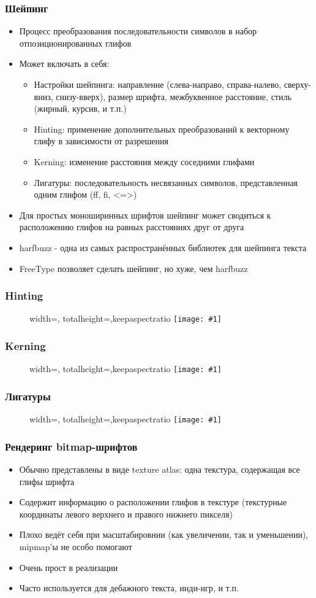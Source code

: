 \documentclass{beamer}
\newcommand{\slideimage}[1]{
  \begin{figure}
    \begin{adjustbox}{width=\textwidth, totalheight=\textheight-2\baselineskip-2\baselineskip,keepaspectratio}
      \texttt{[image: \#1]}
    \end{adjustbox}
  \end{figure}
}
\begin{document}
\begin{frame}[fragile]
\frametitle{Шейпинг}
\begin{itemize}
\item Процесс преобразования последовательности символов в набор отпозиционированных глифов
\pause
\item Может включать в себя:
\pause
\begin{itemize}
\item Настройки шейпинга: направление (слева-направо, справа-налево, сверху-вниз, снизу-вверх), размер шрифта, межбуквенное расстояние, стиль (жирный, курсив, и т.п.)
\pause
\item Hinting: применение дополнительных преобразований к векторному глифу в зависимости от разрешения
\pause
\item Kerning: изменение расстояния между соседними глифами
\pause
\item Лигатуры: последовательность несвязанных символов, представленная одним глифом (ff, fi, <=>)
\end{itemize}
\pause
\item Для простых моноширинных шрифтов шейпинг может сводиться к расположению глифов на равных расстояниях друг от друга
\pause
\item harfbuzz - одна из самых распространённых библиотек для шейпинга текста
\item FreeType позволяет сделать шейпинг, но хуже, чем harfbuzz
\end{itemize}
\end{frame}

\begin{frame}[fragile]
\frametitle{Hinting}
\slideimage{hinting.png}
\end{frame}

\begin{frame}[fragile]
\frametitle{Kerning}
\slideimage{kerning.png}
\end{frame}

\begin{frame}[fragile]
\frametitle{Лигатуры}
\slideimage{ligatures.png}
\end{frame}

\begin{frame}[fragile]
\frametitle{Рендеринг bitmap-шрифтов}
\begin{itemize}
\item Обычно представлены в виде texture atlas: одна текстура, содержащая все глифы шрифта
\pause
\item Содержит информацию о расположении глифов в текстуре (текстурные координаты левого верхнего и правого нижнего пикселя)
\pause
\item Плохо ведёт себя при масштабировнии (как увеличении, так и уменьшении), mipmap'ы не особо помогают
\pause
\item Очень прост в реализации
\pause
\item Часто используется для дебажного текста, инди-игр, и т.п.
\end{itemize}
\end{frame}
\end{document}
